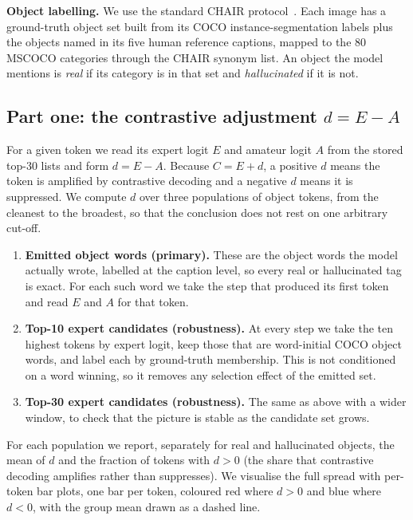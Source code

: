 \documentclass{article}
\begin{document}
\textbf{Object labelling.} We use the standard CHAIR
protocol~\citep{rohrbach2018chair}. Each image has a
ground-truth object set built from its COCO instance-segmentation labels plus the
objects named in its five human reference captions, mapped to the 80 MSCOCO
categories through the CHAIR synonym list. An object the model mentions is
\emph{real} if its category is in that set and \emph{hallucinated} if it is not.

\subsection{Part one: the contrastive adjustment \texorpdfstring{$d = E - A$}{d = E - A}}
\label{subsec:dproxy-danalysis}

For a given token we read its expert logit $E$ and amateur logit $A$ from the
stored top-30 lists and form $d = E - A$. Because $C = E + d$, a positive $d$
means the token is amplified by contrastive decoding and a negative $d$ means it
is suppressed. We compute $d$ over three populations of object tokens, from the
cleanest to the broadest, so that the conclusion does not rest on one arbitrary
cut-off.

\begin{enumerate}
  \item \textbf{Emitted object words (primary).} These are the object words the
  model actually wrote, labelled at the caption level, so every real or
  hallucinated tag is exact. For each such word we take the step that produced
  its first token and read $E$ and $A$ for that token.
  \item \textbf{Top-10 expert candidates (robustness).} At every step we take the
  ten highest tokens by expert logit, keep those that are word-initial COCO
  object words, and label each by ground-truth membership. This is not
  conditioned on a word winning, so it removes any selection effect of the
  emitted set.
  \item \textbf{Top-30 expert candidates (robustness).} The same as above with a
  wider window, to check that the picture is stable as the candidate set grows.
\end{enumerate}

For each population we report, separately for real and hallucinated objects, the
mean of $d$ and the fraction of tokens with $d > 0$ (the share that contrastive
decoding amplifies rather than suppresses). We visualise the full spread with
per-token bar plots, one bar per token, coloured red where $d > 0$ and blue where
$d < 0$, with the group mean drawn as a dashed line.
\end{document}

